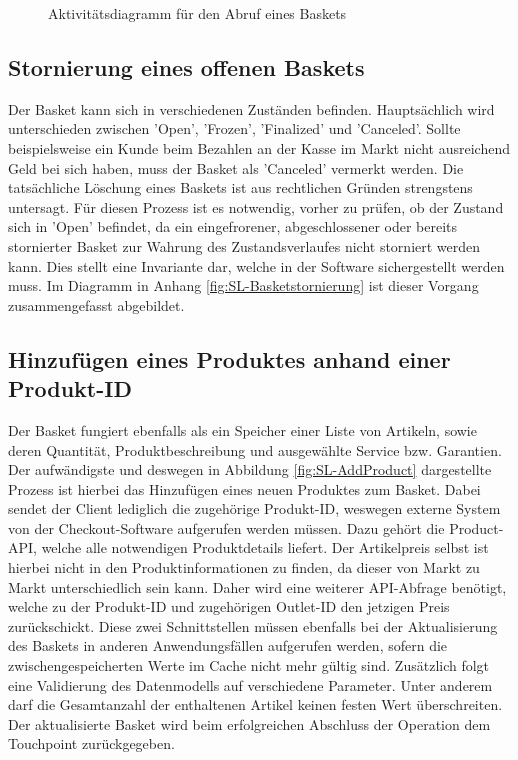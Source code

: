 \begin{figure}[h!]
	\centering
	
	\caption{Aktivitätsdiagramm für den Abruf eines Baskets}
	\label{fig:SL-Basketabruf}
\end{figure}

\subsection{Stornierung eines offenen Baskets}

Der Basket kann sich in verschiedenen Zuständen befinden. Hauptsächlich wird unterschieden zwischen 'Open', 'Frozen', 'Finalized' und 'Canceled'. Sollte beispielsweise ein Kunde beim Bezahlen an der Kasse im Markt nicht ausreichend Geld bei sich haben, muss der Basket als 'Canceled' vermerkt werden. Die tatsächliche Löschung eines Baskets ist aus rechtlichen Gründen strengstens untersagt. Für diesen Prozess ist es notwendig, vorher zu prüfen, ob der Zustand sich in 'Open' befindet, da ein eingefrorener, abgeschlossener oder bereits stornierter Basket zur Wahrung des Zustandsverlaufes nicht storniert werden kann. Dies stellt eine Invariante dar, welche in der Software sichergestellt werden muss. Im Diagramm in Anhang \ref{fig:SL-Basketstornierung} ist dieser Vorgang zusammengefasst abgebildet.


\subsection{Hinzufügen eines Produktes anhand einer Produkt-ID}

Der Basket fungiert ebenfalls als ein Speicher einer Liste von Artikeln, sowie deren Quantität, Produktbeschreibung und ausgewählte Service bzw. Garantien. Der aufwändigste und deswegen in Abbildung \ref{fig:SL-AddProduct} dargestellte Prozess ist hierbei das Hinzufügen eines neuen Produktes zum Basket. Dabei sendet der Client lediglich die zugehörige Produkt-ID, weswegen externe System von der Checkout-Software aufgerufen werden müssen. Dazu gehört die Product-API, welche alle notwendigen Produktdetails liefert. Der Artikelpreis selbst ist hierbei nicht in den Produktinformationen zu finden, da dieser von Markt zu Markt unterschiedlich sein kann. Daher wird eine weiterer API-Abfrage benötigt, welche zu der Produkt-ID und zugehörigen Outlet-ID den jetzigen Preis zurückschickt. Diese zwei Schnittstellen müssen ebenfalls bei der Aktualisierung des Baskets in anderen Anwendungsfällen aufgerufen werden, sofern die zwischengespeicherten Werte im Cache nicht mehr gültig sind. Zusätzlich folgt eine Validierung des Datenmodells auf verschiedene Parameter. Unter anderem darf die Gesamtanzahl der enthaltenen Artikel keinen festen Wert überschreiten. Der aktualisierte Basket wird beim erfolgreichen Abschluss der Operation dem Touchpoint zurückgegeben.

